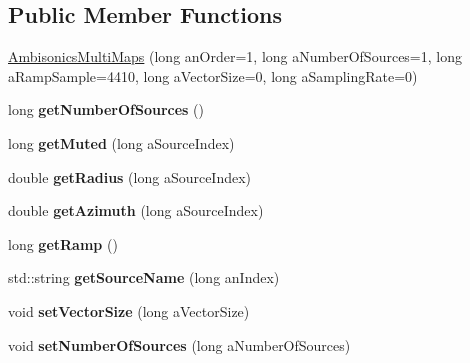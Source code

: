 \subsection*{Public Member Functions}
\begin{DoxyCompactItemize}
\item 
\hyperlink{class_ambisonics_multi_maps_a44cd07ce71531668e9f950ef35fc4f74}{Ambisonics\-Multi\-Maps} (long an\-Order=1, long a\-Number\-Of\-Sources=1, long a\-Ramp\-Sample=4410, long a\-Vector\-Size=0, long a\-Sampling\-Rate=0)
\item 
\hypertarget{class_ambisonics_multi_maps_abc7b6728ceae6a4c8e3322a51b1fc6de}{long {\bfseries get\-Number\-Of\-Sources} ()}\label{class_ambisonics_multi_maps_abc7b6728ceae6a4c8e3322a51b1fc6de}

\item 
\hypertarget{class_ambisonics_multi_maps_ad6182a18f461c46f5484ebf06f3cacd5}{long {\bfseries get\-Muted} (long a\-Source\-Index)}\label{class_ambisonics_multi_maps_ad6182a18f461c46f5484ebf06f3cacd5}

\item 
\hypertarget{class_ambisonics_multi_maps_ad763b353e4189018ea90e4056b6b70d5}{double {\bfseries get\-Radius} (long a\-Source\-Index)}\label{class_ambisonics_multi_maps_ad763b353e4189018ea90e4056b6b70d5}

\item 
\hypertarget{class_ambisonics_multi_maps_a7d4f49822ebac5640901d7874458b6dd}{double {\bfseries get\-Azimuth} (long a\-Source\-Index)}\label{class_ambisonics_multi_maps_a7d4f49822ebac5640901d7874458b6dd}

\item 
\hypertarget{class_ambisonics_multi_maps_ad5628dffa6f0db84c0ef586c64ef5528}{long {\bfseries get\-Ramp} ()}\label{class_ambisonics_multi_maps_ad5628dffa6f0db84c0ef586c64ef5528}

\item 
\hypertarget{class_ambisonics_multi_maps_a19e9a91b0249fac400694e9abee5873c}{std\-::string {\bfseries get\-Source\-Name} (long an\-Index)}\label{class_ambisonics_multi_maps_a19e9a91b0249fac400694e9abee5873c}

\item 
\hypertarget{class_ambisonics_multi_maps_aaeab01b8498a639b57cb505afde11550}{void {\bfseries set\-Vector\-Size} (long a\-Vector\-Size)}\label{class_ambisonics_multi_maps_aaeab01b8498a639b57cb505afde11550}

\item 
\hypertarget{class_ambisonics_multi_maps_a544202615489298825be4a5154b9d71b}{void {\bfseries set\-Number\-Of\-Sources} (long a\-Number\-Of\-Sources)}\label{class_ambisonics_multi_maps_a544202615489298825be4a5154b9d71b}


\end{DoxyCompactItemize}
